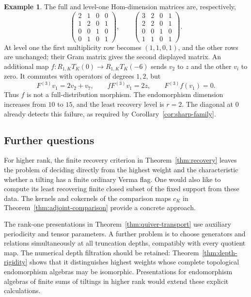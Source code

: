 \documentclass[11pt,reqno]{amsart}
\theoremstyle{definition}
\newtheorem{example}[theorem]{Example}
\theoremstyle{remark}
\numberwithin{equation}{section}
\begin{document}
\begin{example}
The full and level-one Hom-dimension matrices are, respectively,
\[
 \begin{pmatrix}
 2&1&0&0\\1&2&0&1\\0&0&1&0\\0&1&0&1
 \end{pmatrix},
 \qquad
 \begin{pmatrix}
 3&2&0&1\\2&2&0&1\\0&0&1&0\\1&1&0&1
 \end{pmatrix}.
\]
At level one the first multiplicity row becomes $(1,1,0,1)$,
and the other rows are unchanged; their Gram matrix gives the second
displayed matrix. An additional map
$f:R_{1,K}T_K(0)\to R_{1,K}T_K(-6)$ sends $v_2$ to $z$ and
the other $v_i$ to zero. It commutes with operators of degrees $1,2$,
but
\[
 F^{(3)}v_1=2v_2+v_7,\qquad fF^{(3)}v_1=2z,
 \qquad F^{(3)}f(v_1)=0.
\]
Thus $f$ is not a full-distribution morphism. The endomorphism
dimension increases from $10$ to $15$, and the least recovery
level is $r=2$. The diagonal at $0$ already detects this failure,
as required by Corollary~\ref{cor:sharp-family}.
\end{example}

\subsection{Further questions}
For higher rank, the finite recovery criterion in
Theorem~\ref{thm:recovery} leaves the problem of deciding directly from
the highest weight and the characteristic whether a tilting has a
finite ordinary Verma flag. One would also like to compute its least
recovering finite closed subset of the fixed support from these data.
The kernels and cokernels of the comparison maps $c_K$ in
Theorem~\ref{thm:adjoint-comparison} provide a concrete approach.

The rank-one presentations in Theorem~\ref{thm:quiver-transport}
use auxiliary periodicity and tensor parameters. A further problem is
to choose generators and relations simultaneously at all truncation
depths, compatibly with every quotient map. The numerical depth
filtration should be retained: Theorem~\ref{thm:depth-rigidity} shows
that it distinguishes highest weights whose complete topological
endomorphism algebras may be isomorphic. Presentations for
endomorphism algebras of finite sums of tiltings in higher rank
would extend these explicit calculations.
\end{document}
